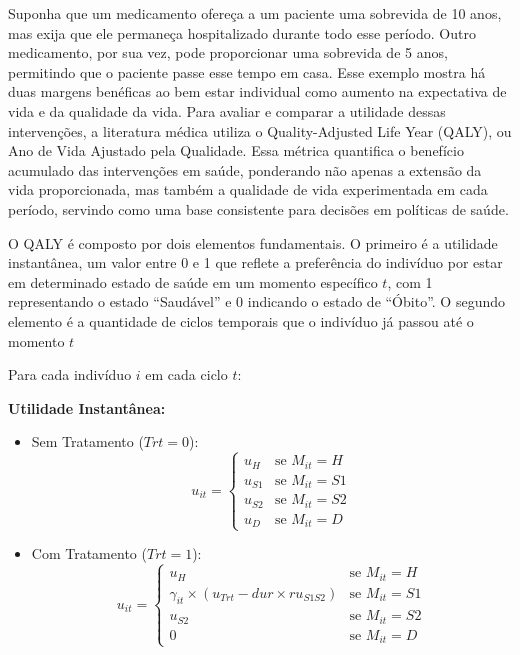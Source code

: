 \documentclass[12pt, a4paper, openany]{book}
\numberwithin{equation}{chapter}
\numberwithin{table}{chapter}
\numberwithin{figure}{chapter}
\theoremstyle{break}
\begin{document}
Suponha que um medicamento ofereça a um paciente uma sobrevida de 10 anos, mas exija que ele permaneça hospitalizado durante todo esse período. Outro medicamento, por sua vez, pode proporcionar uma sobrevida de 5 anos, permitindo que o paciente passe esse tempo em casa. Esse exemplo mostra há duas margens benéficas ao bem estar individual como aumento na expectativa de vida e da qualidade da vida. Para avaliar e comparar a utilidade dessas intervenções, a literatura médica utiliza o Quality-Adjusted Life Year (QALY), ou Ano de Vida Ajustado pela Qualidade. Essa métrica quantifica o benefício acumulado das intervenções em saúde, ponderando não apenas a extensão da vida proporcionada, mas também a qualidade de vida experimentada em cada período, servindo como uma base consistente para decisões em políticas de saúde.

O QALY é composto por dois elementos fundamentais. O primeiro é a utilidade instantânea, um valor entre 0 e 1 que reflete a preferência do indivíduo por estar em determinado estado de saúde em um momento específico $t$, com 1 representando o estado ``Saudável'' e 0 indicando o estado de ``Óbito''. O segundo elemento é a quantidade de ciclos temporais que o indivíduo já passou até o momento $t$

 

Para cada indivíduo \( i \) em cada ciclo \( t \):


\textbf{Utilidade Instantânea:}
    \begin{itemize}
        \item Sem Tratamento (\( Trt = 0 \)):
        \[
        u_{it} =
        \begin{cases}
            u_H & \text{se } M_{it} = H \\
            u_{S1} & \text{se } M_{it} = S1 \\
            u_{S2} & \text{se } M_{it} = S2 \\
            u_D & \text{se } M_{it} = D
        \end{cases}
        \]
        \item Com Tratamento (\( Trt = 1 \)):
        \[
        u_{it} =
        \begin{cases}
            u_H & \text{se } M_{it} = H \\
            \gamma_{it} \times (u_{Trt} - dur \times ru_{S1S2}) & \text{se } M_{it} = S1 \\
            u_{S2} & \text{se }  M_{it} =  S2 \\
            0 & \text{se } M_{it} = D
        \end{cases}
        \]
    \end{itemize}
\end{document}
